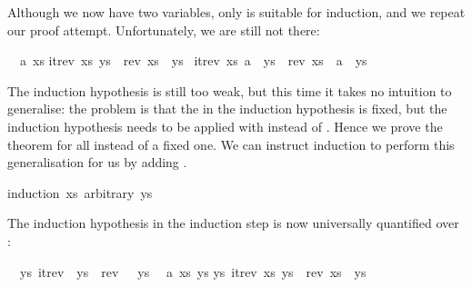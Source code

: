 \begin{isabellebody}
\begin{isamarkuptxt}
Although we now have two variables, only  is suitable for
induction, and we repeat our proof attempt. Unfortunately, we are still
not there:
\begin{isabelle}%
\ {}{}\ {}a\ xs{}\isanewline
{}itrev\ xs\ ys\ {}\ rev\ xs\ {}\ ys\ {}\isanewline
{}itrev\ xs\ {}a\ {}\ ys{}\ {}\ rev\ xs\ {}\ a\ {}\ ys%
\end{isabelle}
The induction hypothesis is still too weak, but this time it takes no
intuition to generalise: the problem is that the 
in the induction hypothesis is fixed,
but the induction hypothesis needs to be applied with
 instead of . Hence we prove the theorem
for all  instead of a fixed one. We can instruct induction
to perform this generalisation for us by adding .%
\end{isamarkuptxt}%
\isamarkuptrue%
%
\endisatagproof
{\isafoldproof}%
%
\isadelimproof
%
\endisadelimproof
%
\isadelimproof
%
\endisadelimproof
%
\isatagproof
{}\isamarkupfalse%
{}induction\ xs\ arbitrary{}\ ys{}%
\begin{isamarkuptxt}%
The induction hypothesis in the induction step is now universally quantified over :
\begin{isabelle}%
\ {}{}\ {}ys{}\ itrev\ {}{}\ ys\ {}\ rev\ {}{}\ {}\ ys\isanewline
\ {}{}\ {}a\ xs\ ys{}\isanewline
{}ys{}\ itrev\ xs\ ys\ {}\ rev\ xs\ {}\ ys{}\ {}\isanewline

\end{isabelle}
\end{isamarkuptxt}
\end{isabellebody}
